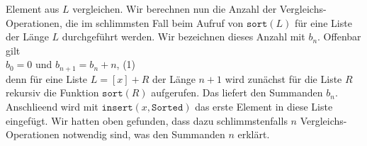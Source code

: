 Element aus $L$ vergleichen.  Wir berechnen nun die Anzahl der
Vergleichs-Operationen, die im schlimmsten Fall beim Aufruf von $\texttt{sort}(L)$ f\"ur
eine Liste der L\"ange $L$ durchgef\"uhrt werden.  Wir bezeichnen dieses Anzahl mit $b_n$.
Offenbar gilt \\[0.1cm]
\hspace*{1.3cm} $b_0 = 0$ \quad und \quad $b_{n+1} = b_n + n$, \hspace*{\fill} (1)\\[0.1cm]
denn f\"ur eine Liste $L = [x] + R$ der L\"ange $n+1$ wird zun\"achst f\"ur die Liste $R$ rekursiv
die Funktion $\mathtt{sort}(R)$ aufgerufen. Das liefert den Summanden $b_n$. Anschlie\3end wird
mit $\mathtt{insert}(x, \mathtt{Sorted})$ 
das erste Element in diese Liste eingef\"ugt.  Wir hatten oben gefunden, dass dazu
schlimmstenfalls $n$
Vergleichs-Operationen notwendig sind, was den Summanden $n$ erkl\"art.

